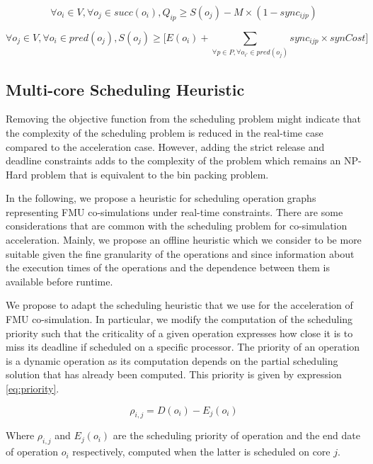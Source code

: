\begin{equation}
\forall o_i \in V, \forall o_j \in succ(o_i), Q_{ip} \geq S(o_j) - M \times (1-sync_{ijp})
\label{schedRT:const_8}
\end{equation} 

\begin{equation}
\forall o_j \in V, \forall o_i \in pred(o_j), S(o_j) \geq \Big[E(o_i) + \sum_{\forall p \in P, \forall o_{i'} \in pred(o_j)}sync_{ijp}\times synCost\Big]
\label{schedRT:const_9}
\end{equation}


\subsection{Multi-core Scheduling Heuristic}

Removing the objective function from the scheduling problem might indicate that the complexity of the scheduling problem is reduced in the real-time case compared to the acceleration case. However, adding the strict release and deadline constraints adds to the complexity of the problem which remains an NP-Hard problem that is equivalent to the bin packing problem.

In the following, we propose a heuristic for scheduling operation graphs representing FMU co-simulations under real-time constraints. There are some considerations that are common with the scheduling problem for co-simulation acceleration. Mainly, we propose an offline heuristic which we consider to be more suitable given the fine granularity of the operations and since information about the execution times of the operations and the dependence between them is available before runtime.

We propose to adapt the scheduling heuristic that we use for the acceleration of FMU co-simulation. In particular, we modify the computation of the scheduling priority such that the criticality of a given operation expresses how close it is to miss its deadline if scheduled on a specific processor. The priority of an operation is a dynamic operation as its computation depends on the partial scheduling solution that has already been computed. This priority is given by expression \ref{eq:priority}.

\begin{equation}
\rho_{i,j} = D(o_i) - E_j(o_i)
\label{eq:priority}
\end{equation}

Where $\rho_{i,j}$ and $E_j(o_i)$ are the scheduling priority of operation and the end date of operation $o_i$ respectively, computed when the latter is scheduled on core $j$.

